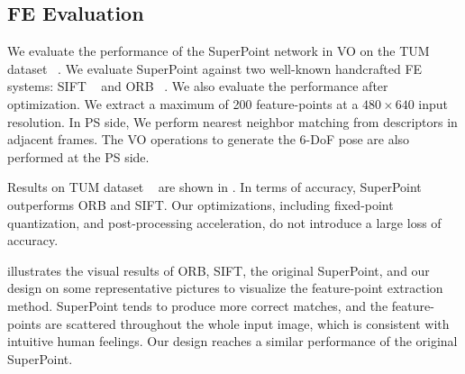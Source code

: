 

\subsection{ FE Evaluation }

We evaluate the performance of the SuperPoint network in VO on the TUM dataset ~\cite{sturm12iros}. We evaluate SuperPoint against two well-known handcrafted FE systems: SIFT ~\cite{Lowe-478} and ORB ~\cite{Mur-Artal:2017281}. 
We also evaluate the performance after optimization. 
We extract a maximum of 200 feature-points at a $480\times640$ input resolution. 
In PS side, We perform nearest neighbor matching from descriptors in adjacent frames. The VO operations to generate the 6-DoF pose are also performed at the PS side.

Results on TUM dataset ~\cite{sturm12iros} are shown in . In terms of accuracy, SuperPoint outperforms ORB and SIFT. Our optimizations, including fixed-point quantization, and post-processing acceleration, do not introduce a large loss of accuracy. 

 illustrates the visual results of ORB, SIFT, the original SuperPoint, and our design on some representative pictures to visualize the feature-point extraction method. 
SuperPoint tends to produce more correct matches, and the feature-points are scattered throughout the whole input image, which is consistent with intuitive human feelings. 
Our design reaches a similar performance of the original SuperPoint. 





